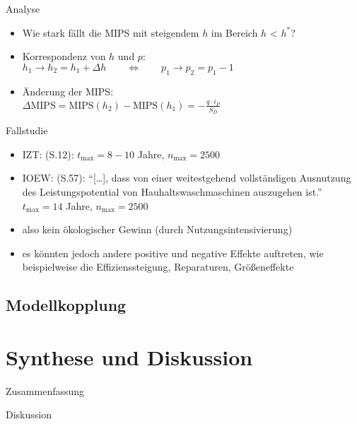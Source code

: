 \documentclass[beamer, xcolor=table]{beamer}
\newcommand{\n}[1]{n_\text{#1}}
\renewcommand{\t}[1]{t_\text{#1}}
\begin{document}
	\begin{frame}{Analyse}		
		\begin{itemize}
			\item<1-> Wie stark fällt die MIPS mit steigendem $h$ im Bereich $h$ < $h^*$?
			\item<2-> Korrespondenz von $h$ und $p$: \\ $h_1 \rightarrow h_2 = h_1 + \Delta h \qquad \Leftrightarrow \qquad p_1 \rightarrow p_2 = p_1 -1$
			\item<3-> Änderung der MIPS: \\ $\Delta \text{MIPS} = \text{MIPS}(h_2) - \text{MIPS}(h_1) = - \frac{q \cdot i_P}{S_D}$
		\end{itemize}
		\begin{center}
			\resizebox{0.5\linewidth}{!}{
				
			}
		\end{center}
	\end{frame}

    \begin{frame}{Fallstudie}
        \begin{itemize}
            \item IZT: (S.12): $\t{max} = 8 - 10$ Jahre, $\n{max} = 2500$
            \item IOEW: (S.57): "`[\dots], dass von einer weitestgehend
                vollständigen Ausnutzung des Leistungspotential von
                Hauhaltswaschmaschinen auszugehen ist."' 
                $\t{max} = 14$ Jahre, $\n{max} = 2500$
            \item also kein ökologischer Gewinn (durch Nutzungsintensivierung)
            \item es könnten jedoch andere positive und negative Effekte
                auftreten, wie beispielweise die Effizienssteigung, Reparaturen,
                Größeneffekte
        \end{itemize}
    \end{frame}
    \subsection{Modellkopplung}
    \section{Synthese und Diskussion}
	\begin{frame}{Zusammenfassung}
	\end{frame}
	\begin{frame}{Diskussion}
	\end{frame}
\end{document}
